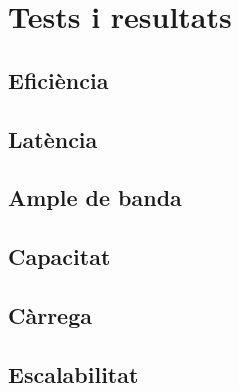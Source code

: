 \chapter{Tests i resultats}
\section{Eficiència}
\section{Latència}
\section{Ample de banda}
\section{Capacitat}
\section{Càrrega}
\section{Escalabilitat}
